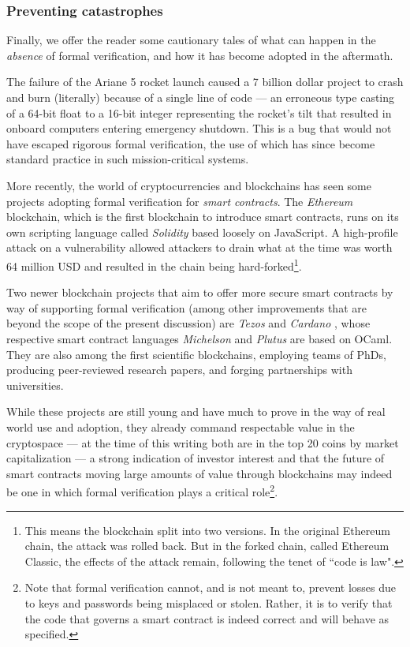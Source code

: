 \documentclass[12pt,notitlepage]{report}
\theoremstyle{plain}
\theoremstyle{definition}
\newcommand{\define}[1]{\emph{#1}\index{#1}}
\numberwithin{equation}{section}
\begin{document}
\subsubsection{Preventing catastrophes}
\par Finally, we offer the reader some cautionary tales of what can happen in the \emph{absence} of formal verification, and how it has become adopted in the aftermath.

\par The failure of the Ariane 5 rocket \cite{Ariane} launch caused a 7 billion dollar project to crash and burn (literally) because of a single line of code --- an erroneous type casting of a 64-bit float to a 16-bit integer representing the rocket's tilt that resulted in onboard computers entering emergency shutdown.  This is a bug that would not have escaped rigorous formal verification, the use of which has since become standard practice in such mission-critical systems.

\par More recently, the world of cryptocurrencies and blockchains has seen some projects adopting formal verification for \define{smart contracts}.  The \define{Ethereum} \cite{Ethereum} blockchain, which is the first blockchain to introduce smart contracts, runs on its own scripting language called \emph{Solidity} based loosely on JavaScript.  A high-profile attack on a vulnerability allowed attackers to drain what at the time was worth 64 million USD and resulted in the chain being hard-forked\footnote{This means the blockchain split into two versions.  In the original Ethereum chain, the attack was rolled back.  But in the forked chain, called Ethereum Classic, the effects of the attack remain, following the tenet of ``code is law".}.  
\par Two newer blockchain projects that aim to offer more secure smart contracts by way of supporting formal verification (among other improvements that are beyond the scope of the present discussion) are \define{Tezos} \cite{Tezos} and \define{Cardano} \cite{Cardano}, whose respective smart contract languages \define{Michelson} and \define{Plutus} are based on OCaml.  They are also among the first scientific blockchains, employing teams of PhDs, producing peer-reviewed research papers, and forging partnerships with universities.
\par While these projects are still young and have much to prove in the way of real world use and adoption, they already command respectable value in the cryptospace --- at the time of this writing both are in the top 20 coins by market capitalization --- a strong indication of investor interest and that the future of smart contracts moving large amounts of value through blockchains may indeed be one in which formal verification plays a critical role\footnote{Note that formal verification cannot, and is not meant to, prevent losses due to keys and passwords being misplaced or stolen.  Rather, it is to verify that the code that governs a smart contract is indeed correct and will behave as specified.}.
\end{document}
